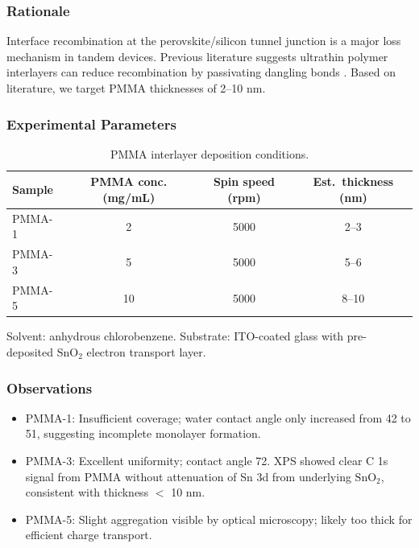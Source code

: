 \documentclass[
    language=english,
    doctype=research-notebook,
    institution=none,
]{../../omnilatex}
\begin{document}
\subsubsection{Rationale}
Interface recombination at the perovskite/silicon tunnel junction is a
major loss mechanism in tandem devices. Previous literature suggests
ultrathin polymer interlayers can reduce recombination by passivating
dangling bonds \cite{chen2023interface}. Based on literature, we target
PMMA thicknesses of 2--10 nm.

\subsubsection{Experimental Parameters}
\begin{table}[htbp]
    \centering
    \caption{PMMA interlayer deposition conditions.}
    \label{tab:jan22-params}
    \begin{tabular}{@{}lccc@{}}
        \toprule
        Sample & PMMA conc. (mg/mL) & Spin speed (rpm) & Est.\ thickness (nm) \\
        \midrule
        PMMA-1 & 2                   & 5000             & 2--3                  \\
        PMMA-3 & 5                   & 5000             & 5--6                  \\
        PMMA-5 & 10                  & 5000             & 8--10                 \\
        \bottomrule
    \end{tabular}
\end{table}

Solvent: anhydrous chlorobenzene. Substrate: ITO-coated glass with
pre-deposited $\text{SnO}_2$ electron transport layer.

\subsubsection{Observations}
\begin{itemize}
    \item PMMA-1: Insufficient coverage; water contact angle only
          increased from 42\degree{} to 51\degree, suggesting incomplete
          monolayer formation.
    \item PMMA-3: Excellent uniformity; contact angle 72\degree. XPS
          showed clear C 1s signal from PMMA without attenuation of Sn
          3d from underlying $\text{SnO}_2$, consistent with thickness
          $<$ 10 nm.
    \item PMMA-5: Slight aggregation visible by optical microscopy;
          likely too thick for efficient charge transport.
\end{itemize}
\end{document}
